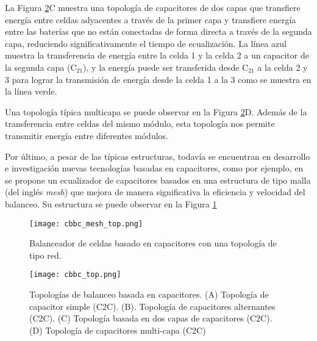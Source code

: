 La Figura \ref{cbbc_top}C muestra una topolog\'ia de capacitores de dos capas
que transfiere energ\'ia entre celdas adyacentes a trav\'es de la primer capa y
transfiere energ\'ia entre las bater\'ias que no est\'an conectadas de forma
directa a trav\'es de la segunda capa, reduciendo significativamente el tiempo
de ecualizaci\'on. La línea azul muestra la transferencia de energ\'ia entre la
celda 1 y la celda 2 a un capacitor de la segunda capa ($\mathrm{C_{21}}$), y la
energ\'ia puede ser transferida desde $\mathrm{C_{21}}$ a la celda 2 y 3 para
lograr la transmisi\'on de energ\'ia desde la celda 1 a la 3 como se muestra en 
la línea verde. 

Una topolog\'ia t\'ipica multicapa se puede observar en la Figura
\ref{cbbc_top}D. Adem\'as de la transferencia entre celdas del mismo m\'odulo,
esta topolog\'ia nos permite transmitir energ\'ia entre diferentes m\'odulos. 

Por \'ultimo, a pesar de las t\'ipicas estructuras, todav\'ia se encuentran
en desarrollo e investigaci\'on nuevas tecnolog\'ias basadas en capacitores,
como por ejemplo, en \cite{shang_et_al_bal_cap} se propone un ecualizador de 
capacitores basados en una estructura de tipo malla (del ingl\'es \emph{mesh}) 
que mejora de manera significativa la eficiencia y velocidad del balanceo. 
Su estructura se puede observar en la Figura \ref{cbbc_mesh_top}

\begin{figure}[h!]
    \begin{center}
        \texttt{[image: cbbc\_mesh\_top.png]}
        \caption{Balanceador de celdas basado en capacitores con una topolog\'ia
        de tipo red.}
        \label{cbbc_mesh_top}
    \end{center}
\end{figure}

\begin{figure}[h!]
    \begin{center}
        \texttt{[image: cbbc\_top.png]}
        \caption{Topolog\'ias de balanceo basada en capacitores. (A) Topolog\'ia
        de capacitor simple (\acrshort{C2C}). (B). Topolog\'ia de capacitores
        alternantes (\acrshort{C2C}). (C) Topolog\'ia basada en dos capas de
        capacitores (\acrshort{C2C}). (D) Topolog\'ia de capacitores multi-capa
        (\acrshort{C2C})}
        \label{cbbc_top}
    \end{center}
\end{figure}


